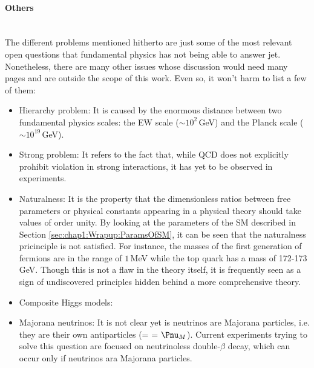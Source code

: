 \paragraph{Others}\mbox{}\\ 
The different problems mentioned hitherto are just some of the most relevant open questions that fundamental 
physics has not being able to answer jet. Nonetheless, there are many other issues whose discussion 
would need many pages and are outside the scope of this work. Even so, it won't harm to list a few of them:
\begin{itemize}
	\item Hierarchy problem: It is caused by the enormous distance between two fundamental physics scales: 
		the EW scale ($\sim10^2\,$GeV) and the Planck scale ($	\sim10^{19}\,$GeV). 
	\item Strong \CP problem: It refers to the fact that, while QCD does not explicitly prohibit \CP 
		violation in strong interactions, it has yet to be observed in experiments. 
	\item Naturalness:  It is the property that the dimensionless ratios between free parameters or physical constants 
		appearing in a physical theory should take values of order unity.  By looking at the parameters of the SM 
		described in Section \ref{sec:chap1:Wrapup:ParamsOfSM}, it can be seen that the naturalness pricinciple
		is not satisfied. For instance, the masses of the first generation of fermions are in the range of $1\,$MeV 
		while the top quark has a mass of 172-173$\,$GeV.
		Though this is not a flaw in the theory itself, it is frequently seen as a sign of undiscovered principles hidden 
		behind a more comprehensive theory.
	\item Composite Higgs models: 
	\item Majorana neutrinos: It is not clear yet is neutrinos are Majorana particles, i.e. they are their own 
		antiparticles (\Pnu = \APnu = $\Pnu_{M}$).
		Current experiments trying to solve this question are focused on neutrinoless double-$\beta$ decay,
		which can occur only if neutrinos ara Majorana particles. 
	\begin{comment}
	\item String theory: It is theoretical framework in which fundamental point-like particles are understood as
		 as vibrational states of a more basic object, the so called ``string''. A string is a one-dimensional 
		 entity that can be either be open (forming a segment with to endpoints) or close (forming a loop)
		 and may have other special properties.  Despite being in development since the late 1970s, 
		 it has not been accepted nor discarded yet. 
	\end{comment}
\end{itemize}

